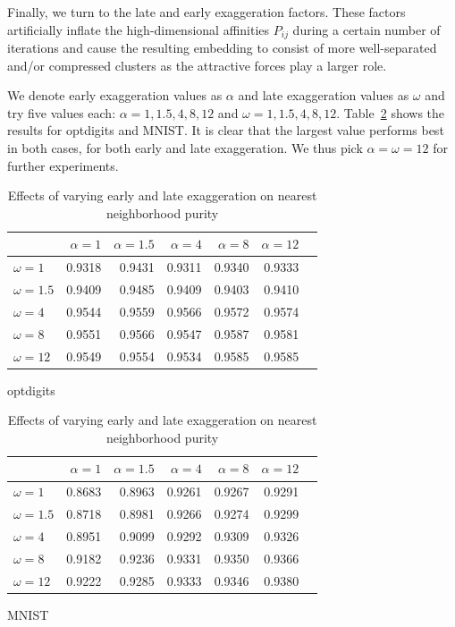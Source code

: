 Finally, we turn to the late and early exaggeration factors. These factors
artificially inflate the high-dimensional affinities $P_{ij}$ during
a certain number of iterations and cause the resulting embedding to consist
of more well-separated and/or compressed clusters as the attractive forces
play a larger role.

We denote early exaggeration values as $\alpha$ and late exaggeration values as
$\omega$ and try five values each: $\alpha = 1, 1.5, 4, 8, 12$ and $\omega = 1,
1.5, 4, 8, 12$.
Table~\ref{tab:exagg} shows the results for optdigits and MNIST. It is clear
that the largest value performs best in both cases, for both early and late
exaggeration. We thus pick $\alpha = \omega = 12$ for further experiments.

\vfill

\begin{table}[tb]
  \centering
\begin{subtable}{\linewidth}
  \centering
  \begin{tabular}{lrrrrrr}
    \toprule
& $\alpha = 1$ & $\alpha = 1.5$ & $\alpha = 4$ & $\alpha = 8$ & $\alpha = 12$ \\ \midrule
$\omega = 1$ & \num{0.9318} & \num{0.9431} & \num{0.9311} & \num{0.9340} & \num{0.9333} \\
$\omega = 1.5$ & \num{0.9409} & \num{0.9485} & \num{0.9409} & \num{0.9403} & \num{0.9410} \\
$\omega = 4$ & \num{0.9544} & \num{0.9559} & \num{0.9566} & \num{0.9572} & \num{0.9574} \\
$\omega = 8$ & \num{0.9551} & \num{0.9566} & \num{0.9547} & \num{0.9587} & \num{0.9581} \\
$\omega = 12$ & \num{0.9549} & \num{0.9554} & \num{0.9534} & \num{0.9585} & \num{0.9585} \\
    \bottomrule
  \end{tabular}
  \caption{optdigits}
\end{subtable}
\par\bigskip
\begin{subtable}{\linewidth}
    \centering
  \begin{tabular}{lrrrrrr}
    \toprule
& $\alpha = 1$ & $\alpha = 1.5$ & $\alpha = 4$ & $\alpha = 8$ & $\alpha = 12$ \\ \midrule
$\omega = 1$ & \num{0.8683} & \num{0.8963} & \num{0.9261} & \num{0.9267} & \num{0.9291} \\
$\omega = 1.5$ & \num{0.8718} & \num{0.8981} & \num{0.9266} & \num{0.9274} & \num{0.9299} \\
$\omega = 4$ & \num{0.8951} & \num{0.9099} & \num{0.9292} & \num{0.9309} & \num{0.9326} \\
$\omega = 8$ & \num{0.9182} & \num{0.9236} & \num{0.9331} & \num{0.9350} & \num{0.9366} \\
$\omega = 12$ & \num{0.9222} & \num{0.9285} & \num{0.9333} & \num{0.9346} & \num{0.9380} \\
    \bottomrule
  \end{tabular}
  \caption{MNIST}
\end{subtable}
\caption{Effects of varying early and late exaggeration on nearest neighborhood purity}
\label{tab:exagg}
\end{table}

